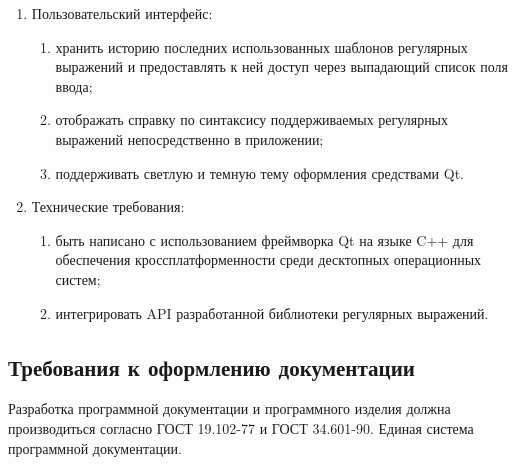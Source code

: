 \begin{enumerate}
	\item Пользовательский интерфейс:
	\begin{enumerate}[label=\alph*)]
		\item хранить историю последних использованных шаблонов регулярных
		выражений и предоставлять к ней доступ через выпадающий список
		поля ввода;
		\item отображать справку по синтаксису поддерживаемых регулярных
		выражений непосредственно в приложении;
		\item поддерживать светлую и темную тему оформления средствами Qt.
	\end{enumerate}
	
	\item Технические требования:
	\begin{enumerate}[label=\alph*)]
		\item быть написано с использованием фреймворка Qt на языке C++
		для обеспечения кроссплатформенности среди десктопных операционных систем;
		\item интегрировать API разработанной библиотеки регулярных выражений.
	\end{enumerate}
\end{enumerate}

\subsection{Требования к оформлению документации}

Разработка программной документации и программного изделия должна производиться согласно ГОСТ 19.102-77 и ГОСТ 34.601-90. Единая система программной документации.
